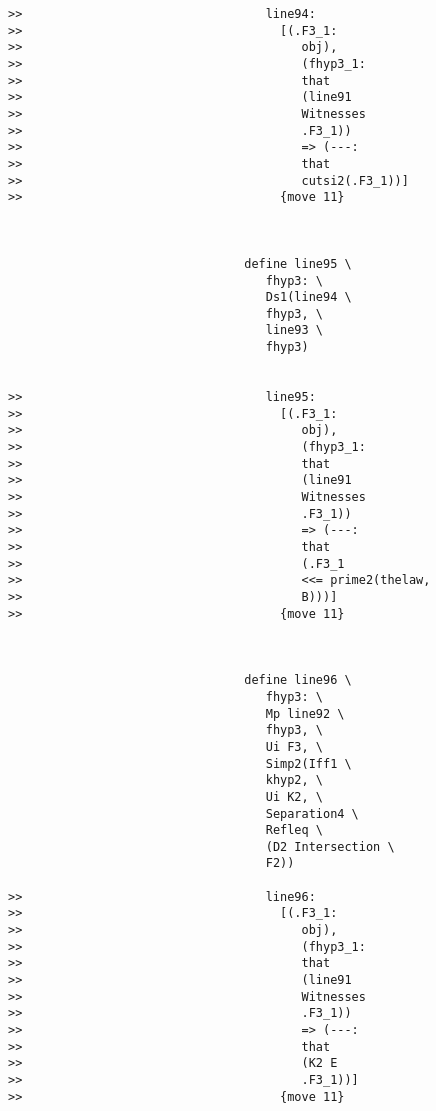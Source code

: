 \documentclass[12pt]{article}
\begin{document}
\begin{verbatim}
>>                                  line94:
>>                                    [(.F3_1:
>>                                       obj),
>>                                       (fhyp3_1:
>>                                       that
>>                                       (line91
>>                                       Witnesses
>>                                       .F3_1))
>>                                       => (---:
>>                                       that
>>                                       cutsi2(.F3_1))]
>>                                    {move 11}



                                 define line95 \
                                    fhyp3: \
                                    Ds1(line94 \
                                    fhyp3, \
                                    line93 \
                                    fhyp3)


>>                                  line95:
>>                                    [(.F3_1:
>>                                       obj),
>>                                       (fhyp3_1:
>>                                       that
>>                                       (line91
>>                                       Witnesses
>>                                       .F3_1))
>>                                       => (---:
>>                                       that
>>                                       (.F3_1
>>                                       <<= prime2(thelaw,
>>                                       B)))]
>>                                    {move 11}



                                 define line96 \
                                    fhyp3: \
                                    Mp line92 \
                                    fhyp3, \
                                    Ui F3, \
                                    Simp2(Iff1 \
                                    khyp2, \
                                    Ui K2, \
                                    Separation4 \
                                    Refleq \
                                    (D2 Intersection \
                                    F2))

>>                                  line96:
>>                                    [(.F3_1:
>>                                       obj),
>>                                       (fhyp3_1:
>>                                       that
>>                                       (line91
>>                                       Witnesses
>>                                       .F3_1))
>>                                       => (---:
>>                                       that
>>                                       (K2 E
>>                                       .F3_1))]
>>                                    {move 11}




\end{verbatim}
\end{document}
